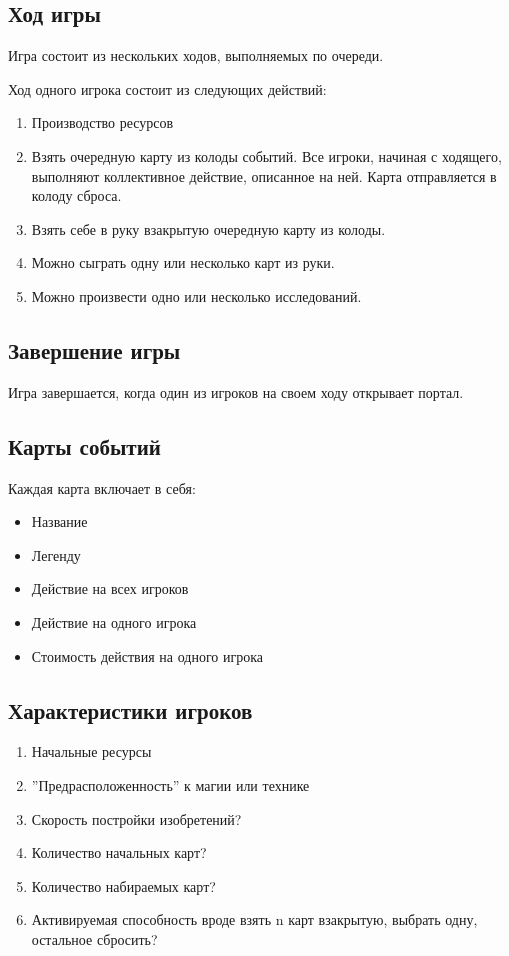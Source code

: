 \documentclass[a4paper,12pt]{article}
\begin{document}
    \subsection{Ход игры}

      Игра состоит из нескольких ходов, выполняемых по очереди.

      Ход одного игрока состоит из следующих действий:
      \begin{enumerate}
        \item Производство ресурсов
        \item Взять очередную карту из колоды событий.
          Все игроки, начиная с ходящего, выполняют коллективное
          действие, описанное на ней. Карта отправляется в колоду
          сброса.
        \item Взять себе в руку взакрытую очередную карту из колоды.
        \item Можно сыграть одну или несколько карт из руки. 
        \item Можно произвести одно или несколько исследований.
      \end{enumerate}

    \subsection{Завершение игры}

      Игра завершается, когда один из игроков на своем ходу
      открывает портал. %

    \subsection{Карты событий}

      Каждая карта включает в себя:
      \begin{itemize}
        \item Название
        \item Легенду
        \item Действие на всех игроков
        \item Действие на одного игрока
        \item Стоимость действия на одного игрока
      \end{itemize}

    \subsection{Характеристики игроков}
      \begin{enumerate}
        \item Начальные ресурсы
        \item ''Предрасположенность'' к магии или технике
        \item Скорость постройки изобретений?
        \item Количество начальных карт?
        \item Количество набираемых карт?
        \item Активируемая способность вроде взять n карт взакрытую, выбрать одну, остальное сбросить?
      \end{enumerate}
\end{document}
